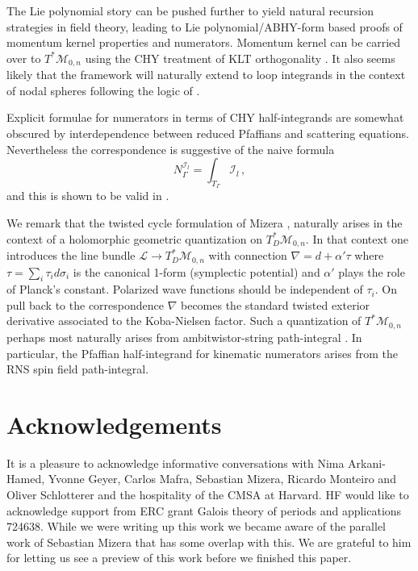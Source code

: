 \documentclass[11pt]{article}
\newcommand{\cI}{\mathcal{I}}
\newcommand{\cL}{\mathcal{L}}
\newcommand{\cM}{\mathcal{M}}
\newcommand{\1}{{\rm 1\hskip-0.25em I}}
\begin{document}
The Lie polynomial story can be pushed further to yield natural recursion strategies in field theory, leading to Lie polynomial/ABHY-form based proofs of momentum kernel properties and numerators.  Momentum kernel can be carried over to $T^*\cM_{0,n}$ using the CHY treatment of KLT orthogonality \cite{Cachazo:2013gna}.  It also seems likely that the framework will naturally extend to loop integrands in the context of nodal spheres following the logic of \cite{Geyer:2015bja}. 


 Explicit formulae for numerators  in terms of CHY half-integrands are somewhat  obscured by interdependence between reduced Pfaffians and scattering equations.  Nevertheless the  correspondence is suggestive of the
 naive formula
\begin{equation}
N^{\cI_l}_\Gamma=\int_{T_\Gamma}\cI_l\, ,
\end{equation}
and this is shown to be valid in \cite{Mizera:2019n}. 

We remark that the twisted cycle formulation of Mizera \cite{Mizera:2019gea}, naturally arises in the context of a holomorphic  geometric quantization on $T^*_D\cM_{0,n}$.  In that context one introduces the line bundle $\cL\rightarrow T^*_D\cM_{0,n}$ with connection $\nabla=d+ \alpha'\tau $  where $\tau=\sum_i \tau_i d\sigma_i$ is the canonical 1-form (symplectic potential) and $\alpha'$ plays the role of Planck's constant. Polarized wave functions should be independent of $\tau_i$.  On pull back to the correspondence $\nabla $ becomes the standard twisted exterior derivative associated to the Koba-Nielsen factor. 
Such a 
quantization of $T^*\cM_{0,n}$ perhaps most naturally arises from ambitwistor-string path-integral \cite{Mason:2013sva}. In particular, the Pfaffian half-integrand for kinematic numerators arises from the RNS spin field path-integral.


\section{Acknowledgements}
It is a pleasure to acknowledge informative conversations with Nima Arkani-Hamed, Yvonne Geyer, Carlos Mafra, Sebastian Mizera, Ricardo Monteiro and Oliver Schlotterer and the hospitality of the CMSA at Harvard. HF would like to acknowledge support from ERC grant Galois theory of periods and applications 724638.  While we were writing up this work we became aware of the parallel work of Sebastian Mizera \cite{Mizera:2019n} that has some overlap with this.  We are grateful to him for letting us see a preview of this work before we finished this paper.

  

\end{document}

